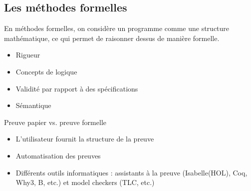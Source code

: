 \documentclass{beamer}
\theoremstyle{definition}
\begin{document}
\subsection{Les méthodes formelles}
\begin{frame}
    En méthodes formelles, on considère un programme comme une structure mathématique, ce qui permet de raisonner dessus de manière formelle.
    \vfill
    \begin{itemize}
        \item Rigueur
        \item Concepts de logique
        \item Validité par rapport à des spécifications
        \item Sémantique
    \end{itemize}
\end{frame}

\begin{frame}
    \begin{center}
        Preuve papier vs. preuve formelle
    \end{center}
    \begin{itemize}
        \item L'utilisateur fournit la structure de la preuve
        \item Automatisation des preuves
        \item Différents outils informatiques : assistants à la preuve (Isabelle(HOL), Coq, Why3, B, etc.) et model checkers (TLC, etc.)
    \end{itemize}
\end{frame}
\end{document}
